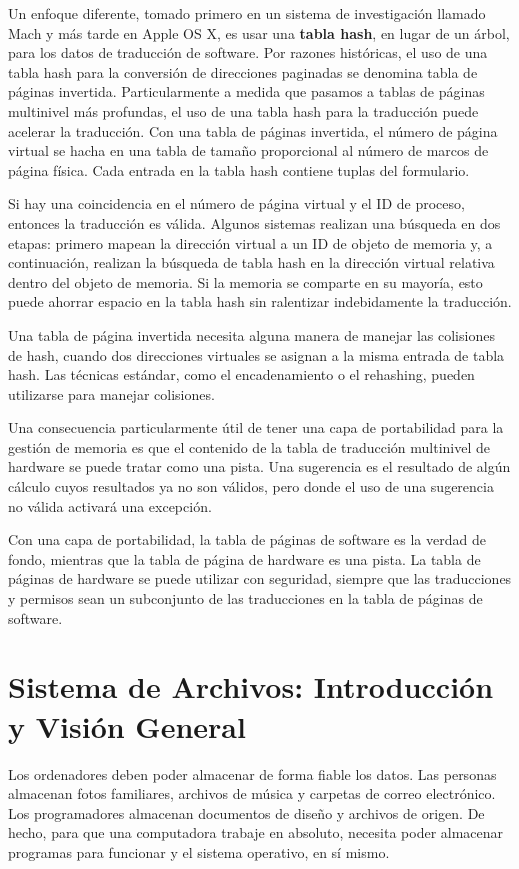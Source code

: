 \documentclass[10pt]{book}
\begin{document}
Un enfoque diferente, tomado primero en un sistema de investigación llamado Mach y más tarde en Apple OS X, es usar una \textbf{tabla hash}, en lugar de un árbol, para los datos de traducción de software. Por razones históricas, el uso de una tabla hash para la conversión de direcciones paginadas se denomina tabla de páginas invertida. Particularmente a medida que pasamos a tablas de páginas multinivel más profundas, el uso de una tabla hash para la traducción puede acelerar la traducción. Con una tabla de páginas invertida, el número de página virtual se hacha en una tabla de tamaño proporcional al número de marcos de página física. Cada entrada en la tabla hash contiene tuplas del formulario.

Si hay una coincidencia en el número de página virtual y el ID de proceso, entonces la traducción es válida. Algunos sistemas realizan una búsqueda en dos etapas: primero mapean la dirección virtual a un ID de objeto de memoria y, a continuación, realizan la búsqueda de tabla hash en la dirección virtual relativa dentro del objeto de memoria. Si la memoria se comparte en su mayoría, esto puede ahorrar espacio en la tabla hash sin ralentizar indebidamente la traducción.

Una tabla de página invertida necesita alguna manera de manejar las colisiones de hash, cuando dos direcciones virtuales se asignan a la misma entrada de tabla hash. Las técnicas estándar, como el encadenamiento o el rehashing, pueden utilizarse para manejar colisiones.

Una consecuencia particularmente útil de tener una capa de portabilidad para la gestión de memoria es que el contenido de la tabla de traducción multinivel de hardware se puede tratar como una pista. Una sugerencia es el resultado de algún cálculo cuyos resultados ya no son válidos, pero donde el uso de una sugerencia no válida activará una excepción.

Con una capa de portabilidad, la tabla de páginas de software es la verdad de fondo, mientras que la tabla de página de hardware es una pista. La tabla de páginas de hardware se puede utilizar con seguridad, siempre que las traducciones y permisos sean un subconjunto de las traducciones en la tabla de páginas de software.

\setcounter{chapter}{10}
\chapter{Sistema de Archivos: Introducción y Visión General}
Los ordenadores deben poder almacenar de forma fiable los datos. Las personas almacenan fotos familiares, archivos de música y carpetas de correo electrónico. Los programadores almacenan documentos de diseño y archivos de origen. De hecho, para que una computadora trabaje en absoluto, necesita poder almacenar programas para funcionar y el sistema operativo, en sí mismo.
\end{document}
